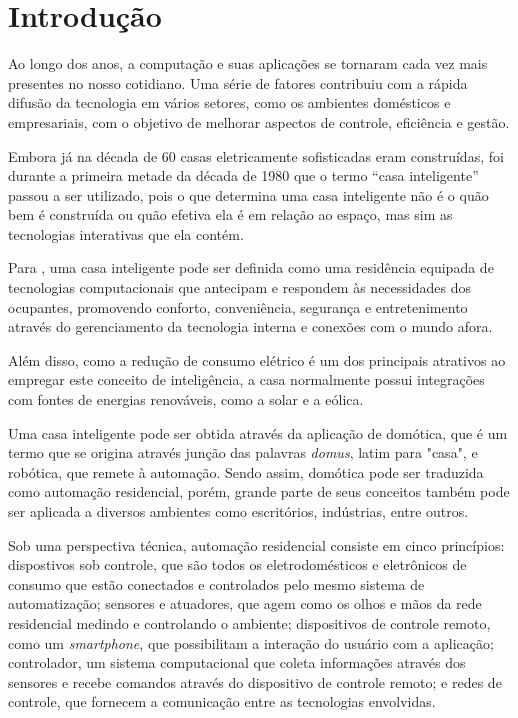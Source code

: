 \chapter{Introdução}

\label{cap:introducao}

Ao longo dos anos, a computação e suas aplicações se tornaram cada vez mais presentes no nosso cotidiano. Uma
série de fatores contribuiu com a rápida difusão da tecnologia em vários setores, como os ambientes domésticos
e empresariais, com o objetivo de melhorar aspectos de controle, eficiência e gestão.

Embora já na década de 60 casas eletricamente sofisticadas eram construídas, foi durante a primeira metade da
década de 1980 que o termo  ``casa inteligente'' passou a ser utilizado, pois o que determina uma casa
inteligente não é o quão bem é construída ou quão efetiva ela é em relação ao espaço, mas sim as tecnologias
interativas que ela contém. \cite{harper2003}

Para , uma casa inteligente pode ser definida como uma residência equipada de
tecnologias computacionais que antecipam e respondem às necessidades dos ocupantes, promovendo conforto,
conveniência, segurança e entretenimento através do gerenciamento da tecnologia interna e conexões com o mundo
afora.

Além disso, como a redução de consumo elétrico é um dos principais atrativos ao empregar este conceito de
inteligência, a casa normalmente possui integrações com fontes de energias renováveis, como a solar e a
eólica.

Uma casa inteligente pode ser obtida através da aplicação de domótica, que é um termo que se origina através
junção das palavras \textit{domus}, latim para "casa", e robótica, que remete à automação. Sendo assim,
domótica pode ser traduzida como automação residencial, porém, grande parte de seus conceitos também pode ser
aplicada a diversos ambientes como escritórios, indústrias, entre outros.

Sob uma perspectiva técnica, automação residencial consiste em cinco princípios: dispostivos sob controle, que
são todos os eletrodomésticos e eletrônicos de consumo que estão conectados e controlados pelo mesmo sistema
de automatização; sensores e atuadores, que agem como os olhos e mãos da rede residencial medindo e
controlando o ambiente; dispositivos de controle remoto, como um \textit{smartphone}, que possibilitam a
interação do usuário com a aplicação; controlador, um sistema computacional que coleta informações através dos
sensores e recebe comandos através do dispositivo de controle remoto; e redes de controle, que fornecem a
comunicação entre as tecnologias envolvidas. \cite{kyas2013}

